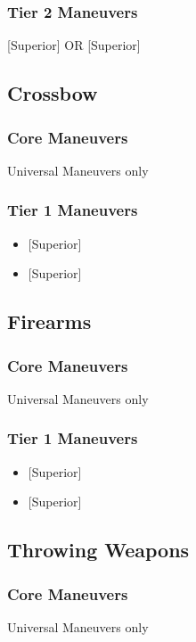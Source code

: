 \documentclass[oneside,11pt,english]{book}
\begin{document}
\subsubsection{Tier 2 Maneuvers}
 [Superior] OR  [Superior]

\subsection{Crossbow}
\subsubsection{Core Maneuvers}
Universal Maneuvers only 

\subsubsection{Tier 1 Maneuvers}
\vspace{-5pt}\begin{itemize}
	[itemsep=0.5mm]
	\item {} [Superior]
	\item {} [Superior]
\end{itemize}
\subsection{Firearms}
\subsubsection{Core Maneuvers}
Universal Maneuvers only

\subsubsection{Tier 1 Maneuvers}
\vspace{-5pt}\begin{itemize}
	[itemsep=0.5mm]
	\item {} [Superior]
	\item {} [Superior]
\end{itemize}
\subsection{Throwing Weapons}
\subsubsection{Core Maneuvers}
Universal Maneuvers only
\end{document}
